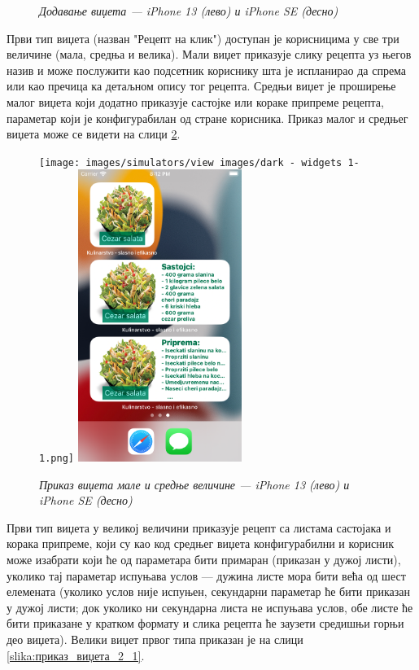 \documentclass[12pt,oneside]{memoir}
\begin{document}
\begin{figure} [H]
    \caption{\textit{Додавање виџета --- iPhone 13 (лево) и iPhone SE (десно)}}
    \label{slika:додавање_виџета_1}
\end{figure}

\indent Први тип виџета (назван "Рецепт на клик") доступан је корисницима у све три величине (мала, средња и велика). Мали виџет приказује слику рецепта уз његов назив и може послужити као подсетник кориснику шта је испланирао да спрема или као пречица ка детаљном опису тог рецепта. Средњи виџет је проширење малог виџета који додатно приказује састојке или кораке припреме рецепта, параметар који је конфигурабилан од стране корисника. Приказ малог и средњег виџета може се видети на слици \ref{slika:приказ_виџета_1_1}.

\begin{figure} [H]
    \centering
    \captionsetup{justification=centering}
    \texttt{[image: images/simulators/view images/dark - widgets 1-1.png]}
    \hfill
    \includegraphics[width=0.475\textwidth]{images/simulators/view images/light - widgets 1-1.png} 
    \caption{\textit{Приказ виџета мале и средње величине --- iPhone 13 (лево) и iPhone SE (десно)}}
    \label{slika:приказ_виџета_1_1}
\end{figure}

\indent Први тип виџета у великој величини приказује рецепт са листама састојака и корака припреме, који су као код средњег виџета конфигурабилни и корисник може изабрати који ће од параметара бити примаран (приказан у дужој листи), уколико тај параметар испуњава услов --- дужина листе мора бити већа од шест елемената (уколико услов није испуњен, секундарни параметар ће бити приказан у дужој листи; док уколико ни секундарна листа не испуњава услов, обе листе ће бити приказане у кратком формату и слика рецепта ће заузети средишњи горњи део виџета). Велики виџет првог типа приказан је на слици \ref{slika:приказ_виџета_2_1}.
\end{document}
